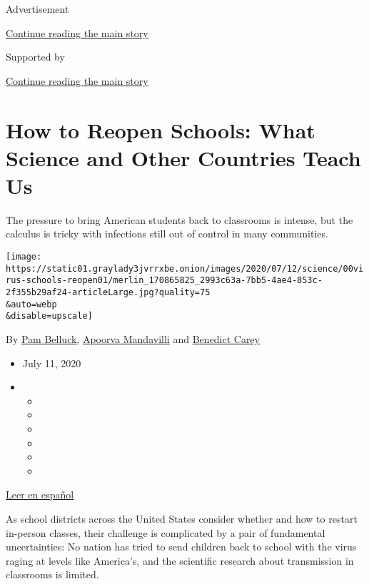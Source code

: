 Advertisement

\protect\hyperlink{after-top}{Continue reading the main story}

Supported by

\protect\hyperlink{after-sponsor}{Continue reading the main story}

\hypertarget{how-to-reopen-schools-what-science-and-other-countries-teach-us}{%
\section{How to Reopen Schools: What Science and Other Countries Teach
Us}\label{how-to-reopen-schools-what-science-and-other-countries-teach-us}}

The pressure to bring American students back to classrooms is intense,
but the calculus is tricky with infections still out of control in many
communities.

\texttt{[image: https://static01.graylady3jvrrxbe.onion/images/2020/07/12/science/00virus-schools-reopen01/merlin\_170865825\_2993c63a-7bb5-4ae4-853c-2f355b29af24-articleLarge.jpg?quality=75\\\&auto=webp\\\&disable=upscale]}

By \href{https://www.nytimes3xbfgragh.onion/by/pam-belluck}{Pam
Belluck},
\href{https://www.nytimes3xbfgragh.onion/by/apoorva-mandavilli}{Apoorva
Mandavilli} and
\href{https://www.nytimes3xbfgragh.onion/by/benedict-carey}{Benedict
Carey}

\begin{itemize}
\item
  July 11, 2020
\item
  \begin{itemize}
  \item
  \item
  \item
  \item
  \item
  \item
  \end{itemize}
\end{itemize}

\href{https://www.nytimes3xbfgragh.onion/es/2020/07/27/espanol/ciencia-y-tecnologia/regreso-a-clases-coronavirus.html}{Leer
en español}

As school districts across the United States consider whether and how to
restart in-person classes, their challenge is complicated by a pair of
fundamental uncertainties: No nation has tried to send children back to
school with the virus raging at levels like America's, and the
scientific research about transmission in classrooms is limited.

